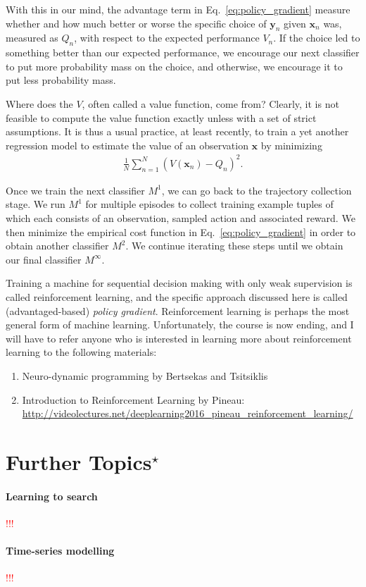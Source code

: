 \documentclass{report}
\newcommand{\vect}[1]{\mathbf{#1}}
\newcommand{\vx}[0]{\vect{x}}
\newcommand{\vy}[0]{\vect{y}}
\newcommand{\todo}[1]{{\Large\textcolor{red}{#1}}}
\begin{document}
With this in our mind, the advantage term in Eq.~\eqref{eq:policy_gradient}
measure whether and how much better or worse the specific choice of $\vy_n$
given $\vx_n$ was, measured as $Q_n$, with respect to the expected performance
$V_n$. If the choice led to something better than our expected performance, we
encourage our next classifier to put more probability mass on the choice, and
otherwise, we encourage it to put less probability mass. 

Where does the $V$, often called a value function, come from? Clearly, it is not
feasible to compute the value function exactly unless with a set of strict
assumptions. It is thus a usual practice, at least recently, to train a yet
another regression model to estimate the value of an observation $\vx$ by
minimizing
\begin{align*}
    \frac{1}{N} \sum_{n=1}^N (V(\vx_n) - Q_n)^2.
\end{align*}

Once we train the next classifier $M^1$, we can go back to the trajectory
collection stage. We run $M^1$ for multiple episodes to collect training example
tuples of which each consists of an observation, sampled action and associated
reward. We then minimize the empirical cost function in
Eq.~\eqref{eq:policy_gradient} in order to obtain another classifier $M^2$. We
continue iterating these steps until we obtain our final classifier
$M^{\infty}$.

Training a machine for sequential decision making with only weak supervision is
called reinforcement learning, and the specific approach discussed here is
called (advantaged-based) {\it policy gradient}. Reinforcement learning is
perhaps the most general form of machine learning. Unfortunately, the course is
now ending, and I will have to refer anyone who is interested in learning more
about reinforcement learning to the following materials:
\begin{enumerate}
    \item Neuro-dynamic programming by Bertsekas and Tsitsiklis
        \cite{bertsekas1996neuro}
    \item Introduction to Reinforcement Learning by Pineau:
        \url{http://videolectures.net/deeplearning2016_pineau_reinforcement_learning/}
\end{enumerate}

\section{Further Topics$^\star$}

\paragraph{Learning to search}

\todo{!!!}

\paragraph{Time-series modelling}

\todo{!!!}












\end{document}
